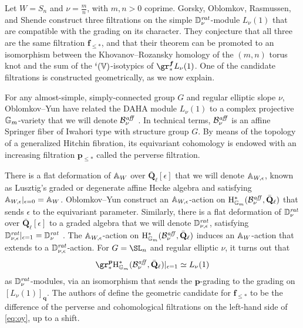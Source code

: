 \documentclass[a4paper,10pt,leqno]{amsart}
\theoremstyle{plain}
\theoremstyle{plain}
\theoremstyle{plain}
\theoremstyle{definition}
\theoremstyle{remark}
\let\Alt\relax
\DeclareMathOperator{\Alt}{\text{$\Lambda$}}
\newcommand{\Q}{\bm{q}}
\newcommand{\QL}{\bar{\mathbf{Q}}_\ell}
\renewcommand{\aff}{\mathit{aff}}
\newcommand{\rat}{\mathit{rat}}
\newcommand{\slope}{\nu}
\begin{document}
Let $W = S_n$ and $\slope = \frac{m}{n}$, with $m, n > 0$ coprime.
Gorsky, Oblomkov, Rasmussen, and Shende construct three filtrations on the simple $\bb{D}_\slope^\rat$-module $L_\slope(1)$ that are compatible with the grading on its character.
They conjecture that all three are the same filtration $\bm{f}_{\leq \ast}$, and that their theorem can be promoted to an isomorphism between the Khovanov--Rozansky homology of the $(m, n)$ torus knot and the sum of the $\Alt^i(\bb{V})$-isotypics of $\gr_\ast^{\bm{f}} L_\slope(1)$.
One of the candidate filtrations is constructed geometrically, as we now explain.

For any almost-simple, simply-connected group $G$ and regular elliptic slope $\slope$, Oblomkov--Yun have related the DAHA module $L_\slope(1)$ to a complex projective $\mathbb{G}_m$-variety that we will denote $\cal{B}_\slope^\aff$ \cite{oy}. 
In technical terms, $\cal{B}_\slope^\aff$ is an affine Springer fiber of Iwahori type with structure group $G$.
By means of the topology of a generalized Hitchin fibration, its equivariant cohomology is endowed with an increasing filtration $\bm{p}_{\leq \ast}$ called the perverse filtration.

There is a flat deformation of $\mathbb{A}_W$ over $\QL[\epsilon]$ that we will denote $\mathbb{A}_{W, \epsilon}$, known as Lusztig's graded or degenerate affine Hecke algebra and satisfying $\mathbb{A}_{W, \epsilon}|_{\epsilon = 0} = \mathbb{A}_W$.
Oblomkov--Yun construct an $\mathbb{A}_{W, \epsilon}$-action on $\ur{H}_{\bb{G}_m}^\ast(\cal{B}_\slope^\aff, \QL)$ that sends $\epsilon$ to the equivariant parameter.
Similarly, there is a flat deformation of $\bb{D}_\slope^\rat$ over $\QL[\epsilon]$ to a graded algebra that we will denote $\bb{D}_{\slope, \epsilon}^\rat$, satisfying $\bb{D}_{\slope, \epsilon}^\rat|_{\epsilon = 1} = \bb{D}_\slope^\rat$ \cite[\S{4.2.4}]{oy}.
The $\mathbb{A}_{W, \epsilon}$-action on $\ur{H}_{\bb{G}_m}^\ast(\cal{B}_\slope^\aff, \QL)$ induces an $\mathbb{A}_W$-action that extends to a $\bb{D}_{\slope, \epsilon}^\rat$-action.
For $G = \SL_n$ and regular elliptic $\slope$, it turns out that
\begin{align}\label{eq:oy}
\gr_\ast^{\bm{p}}\ur{H}_{\bb{G}_m}^\ast(\cal{B}_\slope^\aff, \QL)|_{\epsilon = 1} \simeq L_\slope(1)
\end{align}
as $\bb{D}_\slope^\rat$-modules, via an isomorphism that sends the $\bm{p}$-grading to the grading on $[L_\slope(1)]_{\Q}$.
The authors of \cite{gors} define the geometric candidate for $\bm{f}_{\leq \ast}$ to be the difference of the perverse and cohomological filtrations on the left-hand side of \eqref{eq:oy}, up to a shift.
\end{document}
